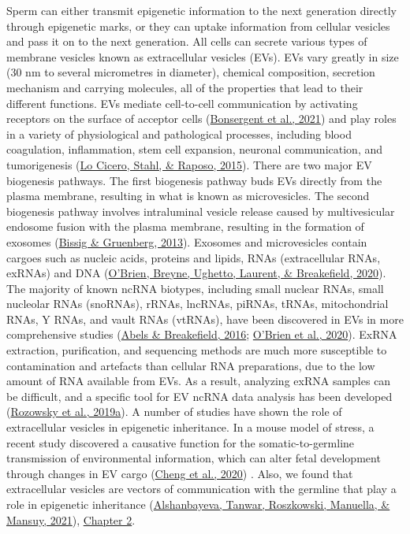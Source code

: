 \documentclass[12pt,twoside]{reedthesis}
\begin{document}
Sperm can either transmit epigenetic information to the next generation
directly through epigenetic marks, or they can uptake information from
cellular vesicles and pass it on to the next generation. All cells can
secrete various types of membrane vesicles known as extracellular
vesicles (EVs). EVs vary greatly in size (30 nm to several micrometres
in diameter), chemical composition, secretion mechanism and carrying
molecules, all of the properties that lead to their different functions.
EVs mediate cell-to-cell communication by activating receptors on the
surface of acceptor cells (\protect\hyperlink{ref-bonsergent2021}{Bonsergent et al., 2021}) and play roles in a variety
of physiological and pathological processes, including blood
coagulation, inflammation, stem cell expansion, neuronal communication,
and tumorigenesis (\protect\hyperlink{ref-locicero2015}{Lo Cicero, Stahl, \& Raposo, 2015}). There are two major EV biogenesis
pathways. The first biogenesis pathway buds EVs directly from the plasma
membrane, resulting in what is known as microvesicles. The second
biogenesis pathway involves intraluminal vesicle release caused by
multivesicular endosome fusion with the plasma membrane, resulting in
the formation of exosomes (\protect\hyperlink{ref-bissig2013}{Bissig \& Gruenberg, 2013}). Exosomes and microvesicles
contain cargoes such as nucleic acids, proteins and lipids, RNAs
(extracellular RNAs, exRNAs) and DNA (\protect\hyperlink{ref-obrien2020}{O'Brien, Breyne, Ughetto, Laurent, \& Breakefield, 2020}). The majority of
known ncRNA biotypes, including small nuclear RNAs, small nucleolar RNAs
(snoRNAs), rRNAs, lncRNAs, piRNAs, tRNAs, mitochondrial RNAs, Y RNAs,
and vault RNAs (vtRNAs), have been discovered in EVs in more
comprehensive studies (\protect\hyperlink{ref-abels2016}{Abels \& Breakefield, 2016}; \protect\hyperlink{ref-obrien2020}{O'Brien et al., 2020}). ExRNA extraction,
purification, and sequencing methods are much more susceptible to
contamination and artefacts than cellular RNA preparations, due to the
low amount of RNA available from EVs. As a result, analyzing exRNA
samples can be difficult, and a specific tool for EV ncRNA data analysis
has been developed (\protect\hyperlink{ref-rozowsky2019}{Rozowsky et al., 2019a}). A number of studies have shown the
role of extracellular vesicles in epigenetic inheritance. In a mouse
model of stress, a recent study discovered a causative function for the
somatic-to-germline transmission of environmental information, which can
alter fetal development through changes in EV cargo (\protect\hyperlink{ref-cheng2020}{Cheng et al., 2020}) . Also,
we found that extracellular vesicles are vectors of communication with
the germline that play a role in epigenetic inheritance
(\protect\hyperlink{ref-alshanbayeva2021}{Alshanbayeva, Tanwar, Roszkowski, Manuella, \& Mansuy, 2021}), \protect\hyperlink{chapter2}{Chapter 2}.
\end{document}
